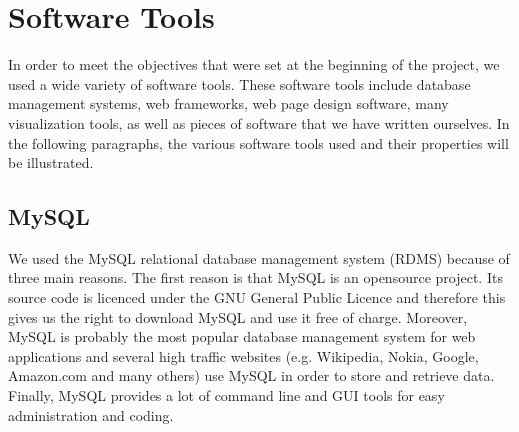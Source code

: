 \section{Software Tools}
In order to meet the objectives that were set at the beginning of the project, we used a wide variety of software tools.
These software tools include database management systems, web frameworks, web page design software, many visualization tools, as well as pieces of software that we have written ourselves.
In the following paragraphs, the various software tools used and their properties will be illustrated.

\subsection{MySQL}
We used the MySQL relational database management system (RDMS) because of three main reasons.
The first reason is that MySQL is an opensource project.
Its source code is licenced under the GNU General Public Licence and therefore this gives us the right to download MySQL and use it free of charge.
Moreover, MySQL is probably the most popular database management system for web applications and several high traffic websites (e.g. Wikipedia, Nokia, Google, Amazon.com and many others) use MySQL in order to store and retrieve data.
Finally, MySQL provides a lot of command line and GUI tools for easy administration and coding.

